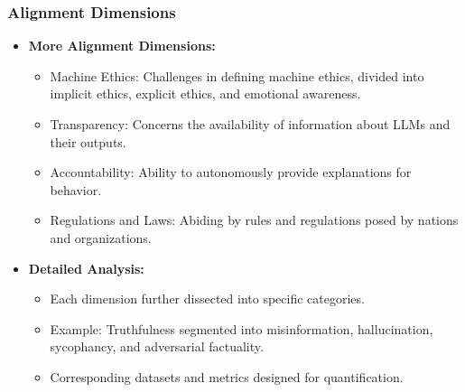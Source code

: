 \begin{frame}[fragile]\frametitle{Alignment Dimensions}
  \begin{itemize}
    \item \textbf{More Alignment Dimensions:}
      \begin{itemize}
        \item Machine Ethics: Challenges in defining machine ethics, divided into implicit ethics, explicit ethics, and emotional awareness.
        \item Transparency: Concerns the availability of information about LLMs and their outputs.
        \item Accountability: Ability to autonomously provide explanations for behavior.
        \item Regulations and Laws: Abiding by rules and regulations posed by nations and organizations.
      \end{itemize}
    \item \textbf{Detailed Analysis:}
      \begin{itemize}
        \item Each dimension further dissected into specific categories.
        \item Example: Truthfulness segmented into misinformation, hallucination, sycophancy, and adversarial factuality.
        \item Corresponding datasets and metrics designed for quantification.
      \end{itemize}
  \end{itemize}
\end{frame}

